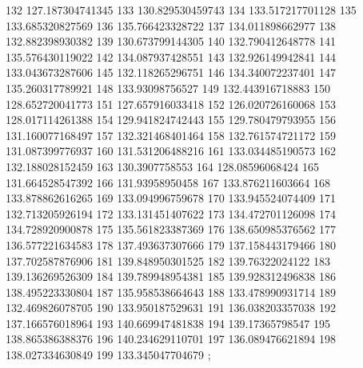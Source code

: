 {132 127.187304741345
133 130.829530459743
134 133.517217701128
135 133.685320827569
136 135.766423328722
137 134.011898662977
138 132.882398930382
139 130.673799144305
140 132.790412648778
141 135.576430119022
142 134.087937428551
143 132.926149942841
144 133.043673287606
145 132.118265296751
146 134.340072237401
147 135.260317789921
148 133.93098756527
149 132.443916718883
150 128.652720041773
151 127.657916033418
152 126.020726160068
153 128.017114261388
154 129.941824742443
155 129.780479793955
156 131.160077168497
157 132.321468401464
158 132.761574721172
159 131.087399776937
160 131.531206488216
161 133.034485190573
162 132.188028152459
163 130.3907758553
164 128.08596068424
165 131.664528547392
166 131.93958950458
167 133.876211603664
168 133.878862616265
169 133.094996759678
170 133.945524074409
171 132.713205926194
172 133.131451407622
173 134.472701126098
174 134.728920900878
175 135.561823387369
176 138.650985376562
177 136.577221634583
178 137.493637307666
179 137.158443179466
180 137.702587876906
181 139.848950301525
182 139.76322024122
183 139.136269526309
184 139.789948954381
185 139.928312496838
186 138.495223330804
187 135.958538664643
188 133.478990931714
189 132.469826078705
190 133.950187529631
191 136.038203357038
192 137.166576018964
193 140.669947481838
194 139.17365798547
195 138.865386388376
196 140.234629110701
197 136.089476621894
198 138.027334630849
199 133.345047704679
};
